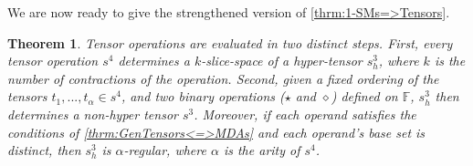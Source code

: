 \documentclass{article}
\theoremstyle{plain}
\newtheorem{theorem}{Theorem}[section]
\theoremstyle{definition}
\theoremstyle{remark}
\begin{document}
We are now ready to give the strengthened version of \cref{thrm:1-SMs=>Tensors}.
\begin{theorem}
	Tensor operations are evaluated in two distinct steps. First, every tensor operation $s^4$ determines a $k$-slice-space of a hyper-tensor $s^3_h$, where $k$ is the number of contractions of the operation. Second, given a fixed ordering of the tensors $t_1, ..., t_{\alpha} \in s^4$, and two binary operations ($\star$ and $\diamond$) defined on $\mathbb{F}$, $s^3_h$ then determines a non-hyper tensor $s^3$. Moreover, if each operand satisfies the conditions of \cref{thrm:GenTensors<=>MDAs} and each operand's base set is distinct, then $s^3_h$ is $\alpha$-regular, where $\alpha$ is the arity of $s^4$.
	\label{thrm:1-SMs=>Tensors_Appendix}
\end{theorem}
\end{document}
